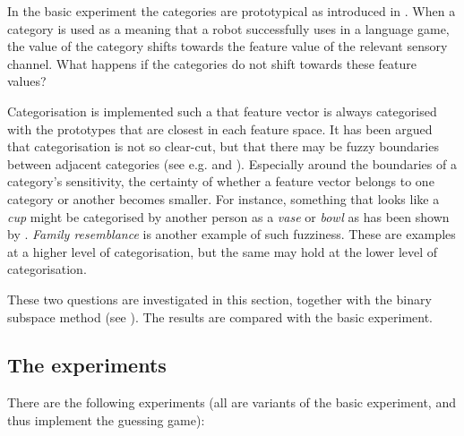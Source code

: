 In the basic experiment the categories are prototypical as introduced in . When a category is used as a meaning that a robot successfully uses in a language game, the value of the category shifts towards the feature value of the relevant sensory channel. What happens if the categories do not shift towards these feature values?

Categorisation is implemented such a that feature vector is always categorised with the prototypes that are closest in each feature space. It has been argued that categorisation is not so clear-cut, but that there may be fuzzy boundaries between adjacent categories (see e.g. \citealt{aitchison:1987} and \citealt{lakoff:1987}). Especially around the boundaries of a category's sensitivity, the certainty of whether a feature vector belongs to one category or another becomes smaller. For instance, something that looks like a {\em cup} might be categorised by another person as a {\em vase} or {\em bowl} as has been shown by \citet{labov:1973}. {\em Family resemblance} \citep{wittgenstein:1958} is another example of such fuzziness.  These are examples at a higher level of categorisation, but the same may hold at the lower level of categorisation.

These two questions are investigated in this section, together with the binary subspace method (see ). The results are compared with the basic experiment.

\subsection{The experiments}

There are the following experiments (all are variants of the basic experiment, and thus implement the guessing game):

